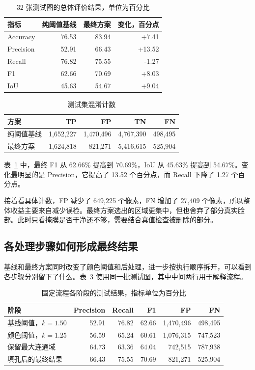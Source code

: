 \begin{table}[H]
\centering
\small
\caption{32 张测试图的总体评价结果，单位为百分比}\label{tab:testmetrics}
\begin{tabular}{lrrr}
\toprule
指标 & 纯阈值基线 & 最终方案 & 变化，百分点 \\
\midrule
Accuracy & 76.53 & 83.94 & +7.41 \\
Precision & 52.91 & 66.43 & +13.52 \\
Recall & 76.82 & 75.55 & -1.27 \\
F1 & 62.66 & 70.69 & +8.03 \\
IoU & 45.63 & 54.67 & +9.04 \\
\bottomrule
\end{tabular}
\end{table}
\begin{table}[H]
\centering
\small
\caption{测试集混淆计数}\label{tab:testcounts}
\begin{tabular}{lrrrr}
\toprule
方案 & TP & FP & TN & FN \\
\midrule
纯阈值基线 & 1,652,227 & 1,470,496 & 4,767,390 & 498,495 \\
最终方案 & 1,624,818 & 821,271 & 5,416,615 & 525,904 \\
\bottomrule
\end{tabular}
\end{table}

表~\ref{tab:testmetrics} 中，最终 F1 从 62.66\% 提高到 70.69\%，IoU 从 45.63\% 提高到 54.67\%。变化最明显的是 Precision，它提高了 13.52 个百分点，而 Recall 下降了 1.27 个百分点。

接着看具体计数，FP 减少了 649,225 个像素，FN 增加了 27,409 个像素，所以整体收益主要来自减少误检。最终方案选出的区域更集中，但也舍弃了部分真实脸部。此时只看掩膜是否干净还不够，需要结合真值检查被删除的部分。

\subsection{各处理步骤如何形成最终结果}

基线和最终方案同时改变了颜色阈值和后处理，进一步按执行顺序拆开，可以看到各步骤分别留下了什么。表~\ref{tab:stages} 使用同一批测试图，其中中间两行用于解释流程。

\begin{table}[H]
\centering
\small
\caption{固定流程各阶段的测试结果，指标单位为百分比}\label{tab:stages}
\begin{tabular}{lrrrrr}
\toprule
阶段 & Precision & Recall & F1 & FP & FN \\
\midrule
基线阈值，$k=1.50$ & 52.91 & 76.82 & 62.66 & 1,470,496 & 498,495 \\
颜色阈值，$k=1.25$ & 56.59 & 65.24 & 60.61 & 1,076,315 & 747,523 \\
保留最大连通域 & 64.73 & 63.36 & 64.04 & 742,515 & 787,938 \\
填孔后的最终结果 & 66.43 & 75.55 & 70.69 & 821,271 & 525,904 \\
\bottomrule
\end{tabular}
\end{table}


